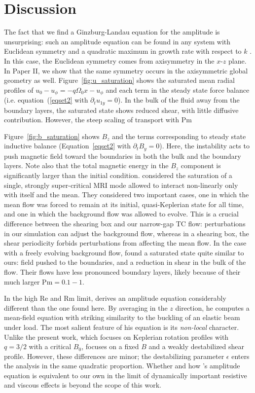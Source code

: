 \documentclass{emulateapj}
\newcommand\reye{\mathrm{Re}}
\newcommand\reym{\mathrm{Rm}}
\newcommand{\Pm}{\mathrm{Pm}}
\begin{document}
\section{Discussion}
\label{sec:discussion}

The fact that we find a Ginzburg-Landau equation for the amplitude is unsurprising: such an amplitude equation can be found in any system with Euclidean symmetry and a quadratic maximum in growth rate with respect to $k$ \citep{Hoyle:2006}. In this case, the Euclidean symmetry comes from axisymmetry in the $x$-$z$ plane.  In Paper II, we show that the same symmetry occurs in the axisymmetric global geometry as well. Figure~\ref{fig:u_saturation} shows the saturated mean radial profiles of $u_0 - u_{\phi} = -q \Omega_0 x - u_{\phi}$ and each term in the steady state force balance (i.e. equation~(\ref{eqset2} with $\partial_t u_{1y} = 0$). In the bulk of the fluid away from the boundary layers, the saturated state shows reduced shear, with little diffusive contribution. However, the steep scaling of transport with $\Pm$

Figure~\ref{fig:b_saturation} shows $B_z$ and the terms corresponding to steady state inductive balance (Equation~\ref{eqset2} with $\partial_t B_{y} = 0$). Here, the instability acts to push magnetic field toward the boundaries in both the bulk and the boundary layers. Note also that the total magnetic energy in the $B_z$ component is significantly larger than the initial condition. \citet{Ebrahimi:2009} considered the saturation of a single, strongly super-critical MRI mode allowed to interact non-linearly only with itself and the mean. They considered two important cases, one in which the mean flow was forced to remain at its initial, quasi-Keplerian state for all time, and one in which the background flow was allowed to evolve. This is a crucial difference between the shearing box and our narrow-gap TC flow: perturbations in our simulation can adjust the background flow, whereas in a shearing box, the shear periodicity forbids perturbations from affecting the mean flow. In the case with a freely evolving background flow, \citet{Ebrahimi:2009ey} found a saturated state quite similar to ours: field pushed to the boundaries, and a reduction in shear in the bulk of the flow. Their flows have less pronounced boundary layers, likely because of their much larger $\Pm = 0.1 -1$. 

In the high $\reye$ and  $\reym$  limit, \citet{Vasil:2015} derives an amplitude equation considerably different than the one found here. By averaging in the $z$ direction, he computes a mean-field equation with striking similarity to the buckling of an elastic beam under load. The most salient feature of his equation is its \emph{non-local} character. Unlike the present work, which focuses on Keplerian rotation profiles with $q = 3/2$ with a critical $B_0$, \citet{Vasil:2015} focuses on a fixed $B$ and a weakly destabilized shear profile. However, these differences are minor; the destabilizing parameter $\epsilon$ enters the analysis in the same quadratic proportion. Whether and how \citet{Vasil:2015}'s amplitude equation is equivalent to our own in the limit of dynamically important resistive and viscous effects is beyond the scope of this work. 
\end{document}
